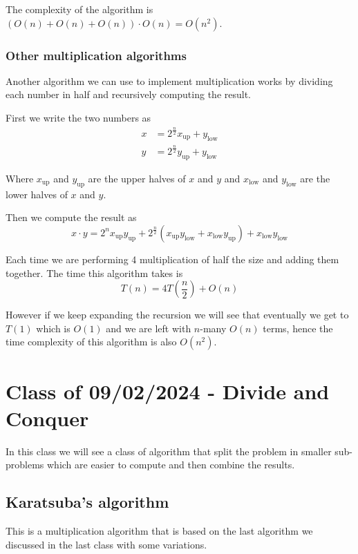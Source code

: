\documentclass[10pt]{extarticle}
\begin{document}
The complexity of the algorithm is $(O(n) + O(n) + O(n)) \cdot O(n) = O(n^2)$.

\subsubsection{Other multiplication algorithms}

Another algorithm we can use to implement multiplication works by dividing each number in half and recursively computing the result.

First we write the two numbers as
\begin{align*}
    x & = 2^{\frac{n}{2}}x_{\text{up}} + y_{\text{low}} \\
    y & = 2^{\frac{n}{2}}y_{\text{up}} + y_{\text{low}}
\end{align*}

Where $x_{\text{up}}$ and $y_{\text{up}}$ are the upper halves of $x$ and $y$ and $x_{\text{low}}$ and $y_{\text{low}}$ are the lower halves of $x$ and $y$.

Then we compute the result as
$$
    x \cdot y = 2^n x_{\text{up}}y_{\text{up}} + 2^{\frac{n}{2}}(x_{\text{up}}y_{\text{low}} + x_{\text{low}}y_{\text{up}}) + x_{\text{low}}y_{\text{low}}
$$

Each time we are performing 4 multiplication of half the size and adding them together.
The time this algorithm takes is
$$
    T(n) = 4T\left(\frac{n}{2}\right) + O(n)
$$

However if we keep expanding the recursion we will see that eventually we get to $T(1)$ which is $O(1)$
and we are left with $n$-many $O(n)$ terms, hence the time complexity of this algorithm is also $O(n^2)$.

\section{Class of 09/02/2024 - Divide and Conquer}

In this class we will see a class of algorithm that
split the problem in smaller sub-problems which are easier to compute and then combine the results.

\subsection{Karatsuba's algorithm}

This is a multiplication algorithm that is based on the last algorithm we discussed in the last class with some variations.
\end{document}
